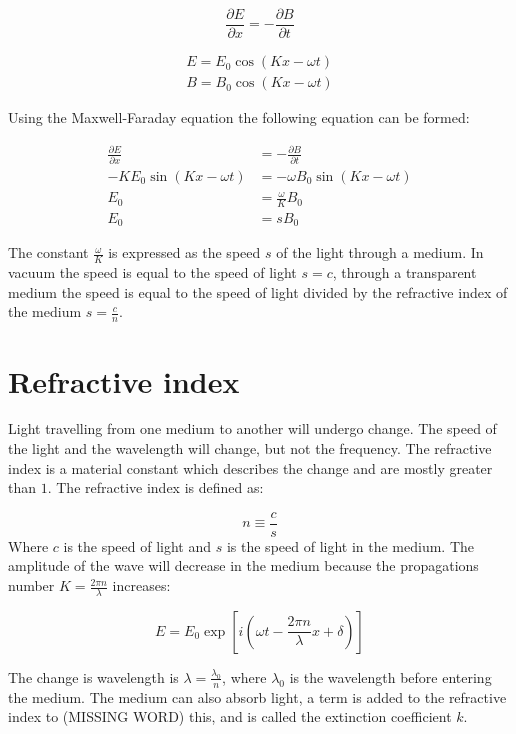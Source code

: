 \documentclass[MasterThesisMain.tex]{subfiles}
\begin{document}
\begin{equation}
\frac{\partial E}{\partial x} = - \frac{\partial B}{\partial t}
\end{equation}

\begin{align}
E = E_0 \cos{(Kx-\omega t)}\\
B = B_0 \cos{(Kx-\omega t)}
\end{align}

Using the Maxwell-Faraday equation the following equation can be formed:

\begin{align}
\frac{\partial E}{\partial x} &= - \frac{\partial B}{\partial t}\\
-K E_0 \sin{(Kx-\omega t)} &= -\omega B_0 \sin{(Kx-\omega t)}\\
E_0 &= \frac{\omega}{K} B_0\\
E_0 &= s B_0
\end{align} 

The constant $\frac{\omega}{K}$ is expressed as the speed $s$ of the light through a medium. In vacuum the speed is equal to the speed of light $s=c$, through a transparent medium the speed is equal to the speed of light divided by the refractive index of the medium $s =\frac{c}{n}$. 

\section{Refractive index} 
Light travelling from one medium to another will undergo change. The speed of the light and the wavelength will change, but not the frequency. The refractive index is a material constant which describes the change and are mostly greater than $1$. The refractive index is defined as:

\begin{equation}
n \equiv \frac{c}{s}
\end{equation}
Where $c$ is the speed of light and $s$ is the speed of light in the medium. The amplitude of the wave will decrease in the medium because the propagations number $K=\frac{2\pi n}{\lambda}$ increases: 

\begin{equation}
E = E_0\exp[i(\omega t - \frac{2\pi n}{\lambda}x + \delta)]
\end{equation}

The change is wavelength is $\lambda = \frac{\lambda_0}{n}$, where $\lambda_0$ is the wavelength before entering the medium. The medium can also absorb light, a term is added to the refractive index to (MISSING WORD) this, and is called the extinction coefficient $k$.
\end{document}
